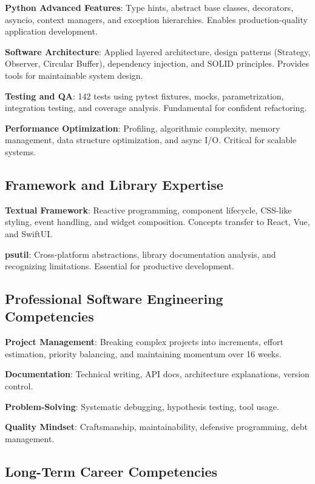 \documentclass[12pt,a4paper,oneside]{report}
\begin{document}
\textbf{Python Advanced Features}: Type hints, abstract base classes, decorators, asyncio, context managers, and exception hierarchies. Enables production-quality application development.

\textbf{Software Architecture}: Applied layered architecture, design patterns (Strategy, Observer, Circular Buffer), dependency injection, and SOLID principles. Provides tools for maintainable system design.

\textbf{Testing and QA}: 142 tests using pytest fixtures, mocks, parametrization, integration testing, and coverage analysis. Fundamental for confident refactoring.

\textbf{Performance Optimization}: Profiling, algorithmic complexity, memory management, data structure optimization, and async I/O. Critical for scalable systems.

\subsection{Framework and Library Expertise}

\textbf{Textual Framework}: Reactive programming, component lifecycle, CSS-like styling, event handling, and widget composition. Concepts transfer to React, Vue, and SwiftUI.

\textbf{psutil}: Cross-platform abstractions, library documentation analysis, and recognizing limitations. Essential for productive development.

\subsection{Professional Software Engineering Competencies}

\textbf{Project Management}: Breaking complex projects into increments, effort estimation, priority balancing, and maintaining momentum over 16 weeks.

\textbf{Documentation}: Technical writing, API docs, architecture explanations, version control.

\textbf{Problem-Solving}: Systematic debugging, hypothesis testing, tool usage.

\textbf{Quality Mindset}: Craftsmanship, maintainability, defensive programming, debt management.

\subsection{Long-Term Career Competencies}
\end{document}
